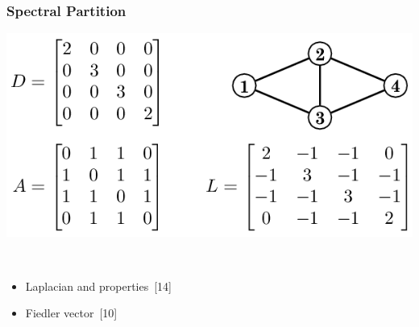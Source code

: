 \documentclass[titlepage,german,presentation]{beamer}
\begin{document}
\begin{frame}
\frametitle{Spectral Partition}

\begin{center}
\includegraphics[height=0.3\textwidth]{laplacian-2}\qquad \qquad
\end{center}
~\\
\begin{itemize}
\item Laplacian and properties~[14] %
\medskip
\item Fiedler vector~[10]
\end{itemize}

\end{frame}
\end{document}
